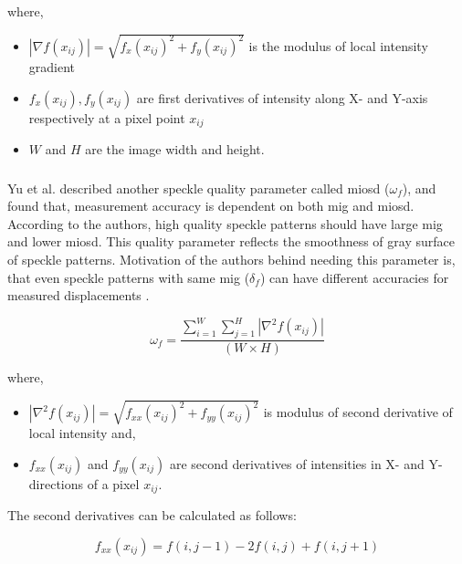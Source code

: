         \noindent where,
        \begin{itemize}
            \item \(|\nabla f(x_{ij})| = \sqrt{f_x(x_{ij})^2 + f_y(x_{ij})^2}\) is the modulus of local intensity gradient
            \item \( f_x(x_{ij}), f_y(x_{ij}) \) are first derivatives of intensity along X- and Y-axis respectively at a pixel point $x_{ij}$
            \item $W$ and $H$ are the image width and height.
        \end{itemize}
    
    \subsubsection{}
        Yu et al. described another speckle quality parameter called \gls{miosd} ($\omega_f$), and found that, measurement accuracy is dependent on both \gls{mig} and \gls{miosd}. According to the authors, high quality speckle patterns should have large \gls{mig} and lower \gls{miosd}. This quality parameter reflects the smoothness of gray surface of speckle patterns. Motivation of the authors behind needing this parameter is, that even speckle patterns with same \gls{mig} ($\delta_f$) can have different accuracies for measured displacements \cite{yu_miosd}. 

        \begin{equation}
            \omega_f = \dfrac{\displaystyle \sum_{i=1}^{W} \displaystyle \sum_{j=1}^{H} |\nabla^2 f(x_{ij})|}{(W \times H)} 
        \end{equation}

        \noindent where,
        \begin{itemize}
            \item \(|\nabla^2f(x_{ij})| = \sqrt{f_{xx}(x_{ij})^2 + f_{yy}(x_{ij})^2}\) is modulus of second derivative of local intensity and,
            \item $f_{xx}(x_{ij})$ and $f_{yy}(x_{ij})$ are second derivatives of intensities in X- and Y-directions of a pixel $x_{ij}$. 
        \end{itemize}

        \noindent The second derivatives can be calculated as follows:

        \begin{equation}
            f_{xx}(x_{ij}) = f(i,j-1) - 2f(i,j) +f(i,j+1)
        \end{equation}

